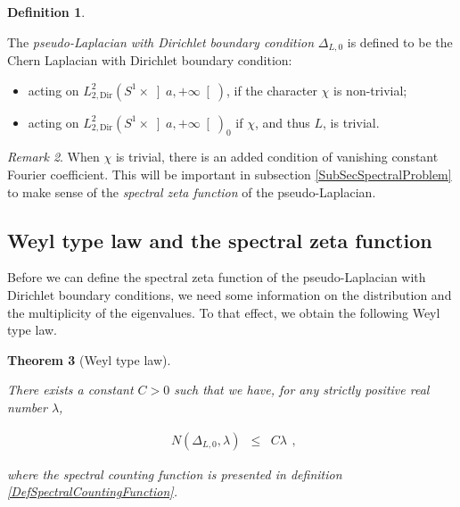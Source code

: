 \documentclass{jams-l}
\newtheorem{theorem}{Theorem}[section]
\theoremstyle{definition}
\newtheorem{definition}[theorem]{Definition}
\theoremstyle{remark}
\newtheorem{remark}[theorem]{Remark}
\numberwithin{equation}{section}
\begin{document}
        \begin{definition}
        \label{DefPseudoLaplacian}
        
            The \textit{pseudo-Laplacian with Dirichlet boundary condition} $\Delta_{L,0}$ is defined to be the Chern Laplacian with Dirichlet boundary condition:
            
            \begin{itemize}
                \item acting on $L^2_{2, \mathrm{Dir}} \left( S^1 \times \left] a, +\infty \right[ \right)$, if the character $\chi$ is non-trivial;
                
                \item acting on $L^2_{2, \mathrm{Dir}} \left( S^1 \times \left] a, +\infty \right[ \right)_0$ if $\chi$, and thus $L$, is trivial.
            \end{itemize}
        
        \end{definition}
        
        \begin{remark}
        
            When $\chi$ is trivial, there is an added condition of vanishing constant Fourier coefficient. This will be important in subsection \ref{SubSecSpectralProblem} to make sense of the \textit{spectral zeta function} of the pseudo-Laplacian.
        
        \end{remark}
        
        
    \subsection{Weyl type law and the spectral zeta function}
    \label{SubSecWeylLaw}
    
        Before we can define the spectral zeta function of the pseudo-Laplacian with Dirichlet boundary conditions, we need some information on the distribution and the multiplicity of the eigenvalues. To that effect, we obtain the following Weyl type law.
        
        \begin{theorem}[Weyl type law]
        \label{ThmWeylLaw}
        
            There exists a constant $C > 0$ such that we have, for any strictly positive real number $\lambda$,
            
            \[ \begin{array}{lll}
                    N \left( \Delta_{L,0}, \lambda \right) & \leqslant & C \lambda
                \end{array} , \]
            
            \noindent where the spectral counting function is presented in definition \ref{DefSpectralCountingFunction}.
        
        \end{theorem}
        
\end{document}
